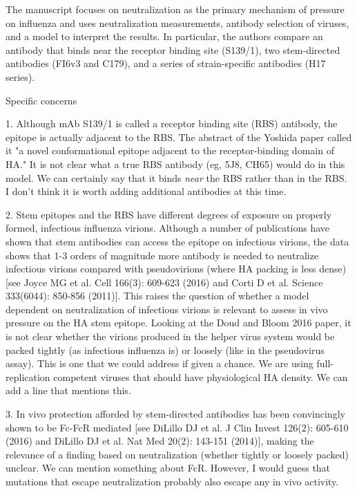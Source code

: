 \documentclass[11pt, oneside]{article}   	%
\begin{document}
The manuscript focuses on neutralization as the primary mechanism of pressure on influenza and uses neutralization measurements, antibody selection of viruses, and a model to interpret the results. In particular, the authors compare an antibody that binds near the receptor binding site (S139/1), two stem-directed antibodies (FI6v3 and C179), and a series of strain-specific antibodies (H17 series).

Specific concerns

1. Although mAb S139/1 is called a receptor binding site (RBS) antibody, the epitope is actually adjacent to the RBS. The abstract of the Yoshida paper called it "a novel conformational epitope adjacent to the receptor-binding domain of HA." It is not clear what a true RBS antibody (eg, 5J8, CH65) would do in this model.
{\color{red} We can certainly say that it binds \emph{near} the RBS rather than in the RBS.
I don't think it is worth adding additional antibodies at this time.}

2. Stem epitopes and the RBS have different degrees of exposure on properly formed, infectious influenza virions. Although a number of publications have shown that stem antibodies can access the epitope on infectious virions, the data shows that 1-3 orders of magnitude more antibody is needed to neutralize infectious virions compared with pseudovirions (where HA packing is less dense) [see Joyce MG et al. Cell 166(3): 609-623 (2016) and Corti D et al. Science 333(6044): 850-856 (2011)]. This raises the question of whether a model dependent on neutralization of infectious virions is relevant to assess in vivo pressure on the HA stem epitope. Looking at the Doud and Bloom 2016 paper, it is not clear whether the virions produced in the helper virus system would be packed tightly (as infectious influenza is) or loosely (like in the pseudovirus assay).
{\color{red}
This is one that we could address if given a chance.
We are using full-replication competent viruses that should have physiological HA density. 
We can add a line that mentions this.
}

3. In vivo protection afforded by stem-directed antibodies has been convincingly shown to be Fc-FcR mediated [see DiLillo DJ et al. J Clin Invest 126(2): 605-610 (2016) and DiLillo DJ et al. Nat Med 20(2): 143-151 (2014)], making the relevance of a finding based on neutralization (whether tightly or loosely packed) unclear.
{\color{red}
We can mention something about FcR.
However, I would guess that mutations that escape neutralization probably also escape any in vivo activity.
}
\end{document}
